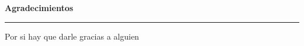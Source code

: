 \newpage
\thispagestyle{empty}
\begin{Huge}
    \bfseries \selectfont Agradecimientos \\
    \rule[0.5ex]{\linewidth}{0.55pt}
\end{Huge}

Por si hay que darle gracias a alguien \lipsum[1-4]